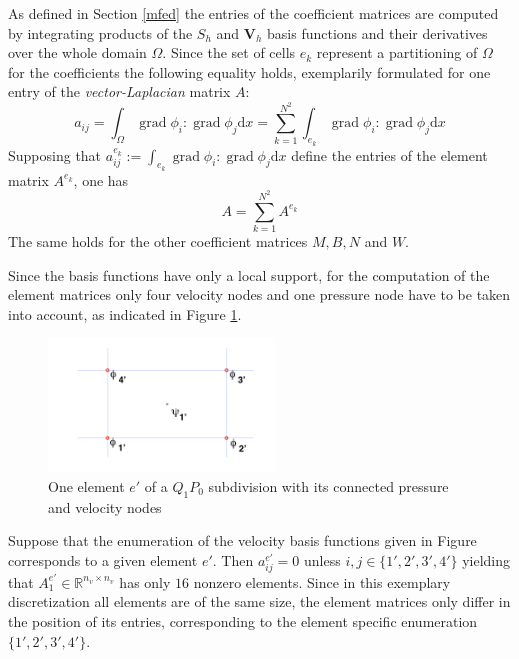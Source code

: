 \documentclass[a4paper,10pt,BCOR=15mm]{scrbook}
\DeclareMathOperator{\grad}{grad}
\providecommand{\inva}[1]{\text{d} #1}
\begin{document}
As defined in Section \ref{mfed} the entries of the coefficient matrices are computed by integrating products of the $S_h$ and $\mathbf V_h$ basis functions and their derivatives over the whole domain $\Omega$. Since the set of cells $e_k$ represent a partitioning of $\Omega$ for the coefficients the following equality holds, exemplarily formulated for one entry of the \textit{vector-Laplacian} matrix $A$:
\begin{equation*}
 a_{ij} = \int _ \Omega \grad \phi_i : \grad \phi_j \inva x = \sum _{k=1} ^ {N^2} \int _{e_k} \grad \phi_i : \grad \phi_j \inva x
\end{equation*}
Supposing that $a_{ij}^{e_k}:=\int _{e_k} \grad \phi_i : \grad \phi_j \inva x$ define the entries of the element matrix $A^{e_k}$, one has 
\begin{equation*}
 A = \sum _{k=1} ^ {N^2}A^{e_k}
\end{equation*}
The same holds for the other coefficient matrices $M,B,N$ and $W$.

Since the basis functions have only a local support, for the computation of the element matrices only four velocity nodes and one pressure node have to be taken into account, as indicated in Figure \ref{q1p0el}.
\begin{figure}[htbp]
  \centering
  \begin{minipage}[b]{6 cm}
    \includegraphics[width=6cm]{pics/q1p0/elemMa.pdf}  
  \end{minipage}
  \caption{One element $e'$ of a $Q_1P_0$ subdivision with its connected pressure and velocity nodes} 
\label{q1p0el}
\end{figure}

Suppose that the enumeration of the velocity basis functions given in Figure corresponds to a given element $e'$. Then $a_{ij}^{e'}=0$ unless $i,j\in\{1',2',3',4'\}$ yielding that $A_1^{e'} \in \mathbb R^{n_v\times n_v}$ has only $16$ nonzero elements. Since in this exemplary discretization all elements are of the same size, the element matrices only differ in the position of its entries, corresponding to the element specific enumeration $\{1',2',3',4'\}$. 
\end{document}
